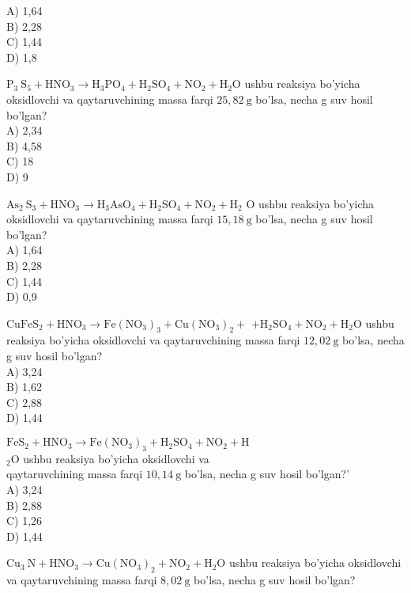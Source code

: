 A) 1,64\\
B) 2,28\\
C) 1,44\\
D) 1,8
  \item $\mathrm{P}_{3} \mathrm{~S}_{5}+\mathrm{HNO}_{3} \rightarrow \mathrm{H}_{3} \mathrm{PO}_{4}+\mathrm{H}_{2} \mathrm{SO}_{4}+\mathrm{NO}_{2}+\mathrm{H}_{2} \mathrm{O}$ ushbu reaksiya bo'yicha oksidlovchi va qaytaruvchining massa farqi $25,82 \mathrm{~g}$ bo'lsa, necha g suv hosil bo'lgan?\\
A) 2,34\\
B) 4,58\\
C) 18\\
D) 9
  \item $\mathrm{As}_{2} \mathrm{~S}_{3}+\mathrm{HNO}_{3} \rightarrow \mathrm{H}_{3} \mathrm{AsO}_{4}+\mathrm{H}_{2} \mathrm{SO}_{4}+\mathrm{NO}_{2}+\mathrm{H}_{2}$ O ushbu reaksiya bo'yicha oksidlovchi va qaytaruvchining massa farqi $15,18 \mathrm{~g}$ bo'lsa, necha g suv hosil bo'lgan?\\
A) 1,64\\
B) 2,28\\
C) 1,44\\
D) 0,9
  \item $\mathrm{CuFeS}_{2}+\mathrm{HNO}_{3} \rightarrow \mathrm{Fe}\left(\mathrm{NO}_{3}\right)_{3}+\mathrm{Cu}\left(\mathrm{NO}_{3}\right)_{2}+$ $+\mathrm{H}_{2} \mathrm{SO}_{4}+\mathrm{NO}_{2}+\mathrm{H}_{2} \mathrm{O}$ ushbu reaksiya bo'yicha oksidlovchi va qaytaruvchining massa farqi $12,02 \mathrm{~g}$ bo'lsa, necha g suv hosil bo'lgan?\\
A) 3,24\\
B) 1,62\\
C) 2,88\\
D) 1,44
  \item $\mathrm{FeS}_{2}+\mathrm{HNO}_{3} \rightarrow \mathrm{Fe}\left(\mathrm{NO}_{3}\right)_{3}+\mathrm{H}_{2} \mathrm{SO}_{4}+\mathrm{NO}_{2}+\mathrm{H}$\\
${ }_{2} \mathrm{O}$ ushbu reaksiya bo'yicha oksidlovchi va\\
qaytaruvchining massa farqi $10,14 \mathrm{~g}$ bo'lsa, necha g suv hosil bo'lgan?'\\
A) 3,24\\
B) 2,88\\
C) 1,26\\
D) 1,44
  \item $\mathrm{Cu}_{3} \mathrm{~N}+\mathrm{HNO}_{3} \rightarrow \mathrm{Cu}\left(\mathrm{NO}_{3}\right)_{2}+\mathrm{NO}_{2}+\mathrm{H}_{2} \mathrm{O}$ ushbu reaksiya bo'yicha oksidlovchi va qaytaruvchining massa farqi $8,02 \mathrm{~g}$ bo'lsa, necha g suv hosil bo'lgan?\\
